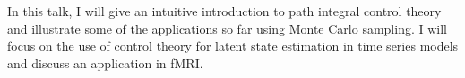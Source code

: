 In this talk, I will give an intuitive introduction to path integral control theory and illustrate some of the applications so far using Monte Carlo sampling. I will focus on the use of control theory for latent state estimation in time series models and discuss an application in fMRI.